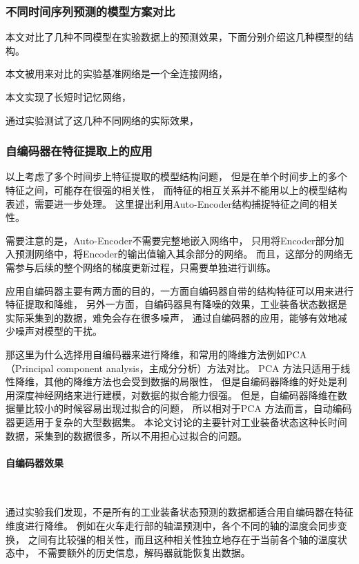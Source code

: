 \subsubsection{不同时间序列预测的模型方案对比}
本文对比了几种不同模型在实验数据上的预测效果，下面分别介绍这几种模型的结构。

本文被用来对比的实验基准网络是一个全连接网络，

本文实现了长短时记忆网络，

通过实验测试了这几种不同网络的实际效果，
\subsubsection{自编码器在特征提取上的应用}
以上考虑了多个时间步上特征提取的模型结构问题，
但是在单个时间步上的多个特征之间，可能存在很强的相关性，
而特征的相互关系并不能用以上的模型结构表述，需要进一步处理。
这里提出利用Auto-Encoder结构捕捉特征之间的相关性。

需要注意的是，Auto-Encoder不需要完整地嵌入网络中，
只用将Encoder部分加入预测网络中，将Encoder的输出值输入其余部分的网络。
而且，这部分的网络无需参与后续的整个网络的梯度更新过程，只需要单独进行训练。

应用自编码器主要有两方面的目的，一方面自编码器自带的结构特征可以用来进行特征提取和降维，
另外一方面，自编码器具有降噪的效果，工业装备状态数据是实际采集到的数据，难免会存在很多噪声，
通过自编码器的应用，能够有效地减少噪声对模型的干扰。

那这里为什么选择用自编码器来进行降维，和常用的降维方法例如PCA
（Principal component analysis，主成分分析）方法对比。
PCA 方法只适用于线性降维，其他的降维方法也会受到数据的局限性，
但是自编码器降维的好处是利用深度神经网络来进行建模，对数据的拟合能力很强。
但是，自编码器降维在数据量比较小的时候容易出现过拟合的问题，
所以相对于PCA 方法而言，自动编码器更适用于复杂的大型数据集。
本论文讨论的主要针对工业装备状态这种长时间数据，采集到的数据很多，所以不用担心过拟合的问题。
\paragraph{自编码器效果}~{}

通过实验我们发现，不是所有的工业装备状态预测的数据都适合用自编码器在特征维度进行降维。
例如在火车走行部的轴温预测中，各个不同的轴的温度会同步变换，
之间有比较强的相关性，而且这种相关性独立地存在于当前各个轴的温度状态中，
不需要额外的历史信息，解码器就能恢复出数据。

